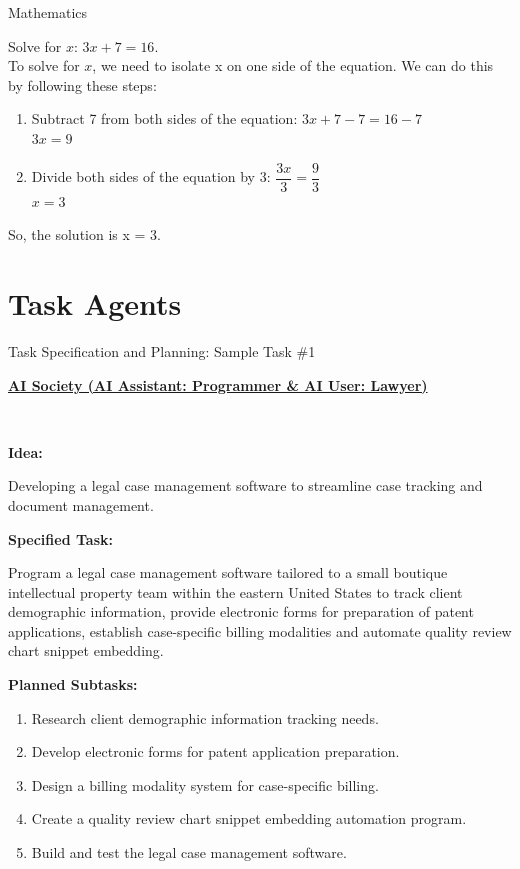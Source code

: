\begin{AIBoxBreak}{Mathematics}

	\usermsg Solve for $x$: $3x + 7 = 16$.\\

	\assistantmsg To solve for $x$, we need to isolate x on one side of the equation. We can do this by following these steps:

	\begin{enumerate}
		\item Subtract 7 from both sides of the equation:  $3x + 7 - 7 = 16 - 7$ \\   $3x = 9$
		\item Divide both sides of the equation by $3$:   $\dfrac{3x}{3} = \dfrac{9}{3}$ \\ $x = 3$
	\end{enumerate}

	So, the solution is x = 3.
\end{AIBoxBreak}



\clearpage
\section{Task Agents}

\begin{AIBox}{Task Specification and Planning: Sample Task \#1}

	\parbox[t]{\textwidth}{
		{\bf\underline{AI Society (AI Assistant: Programmer \& AI User: Lawyer)}}
	}\\

	\parbox[t]{\textwidth}{
		{\bf{Idea:}}

		Developing a legal case management software to streamline case tracking and document management.\\
	}
	\parbox[t]{\textwidth}{
		{\bf{Specified Task:}}

		Program a legal case management software tailored to a small boutique intellectual property team within the eastern United States to track client demographic information, provide electronic forms for preparation of patent applications, establish case-specific billing modalities and automate quality review chart snippet embedding.
		\\}
	\parbox[t]{\textwidth}{
		{\bf{Planned Subtasks:}}
		\begin{enumerate}
			\item Research client demographic information tracking needs.
			\item Develop electronic forms for patent application preparation.
			\item Design a billing modality system for case-specific billing.
			\item Create a quality review chart snippet embedding automation program.
			\item Build and test the legal case management software.
		\end{enumerate}
	}
\end{AIBox}


